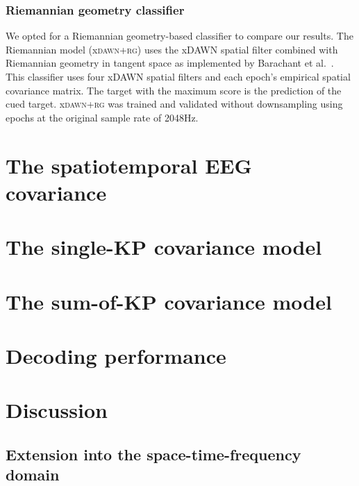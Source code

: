 \subsubsection{Riemannian geometry classifier}
\label{sec:riemannian}
We opted for a Riemannian
geometry-based classifier to compare our results.
The Riemannian model (x\textsc{dawn+rg}) uses the xDAWN spatial filter combined
with Riemannian geometry in tangent space as implemented by Barachant et
al.~\cite{barachant2014meg}.
This classifier uses four xDAWN spatial filters and each epoch's empirical spatial covariance matrix.
The target with the maximum score is the prediction of the cued target.
x\textsc{dawn+rg} was trained and validated without downsampling using epochs
at the original sample rate of 2048Hz.

\section{The spatiotemporal EEG covariance}
\section{The single-KP covariance model}
\section{The sum-of-KP covariance model}
\section{Decoding performance}
\section{Discussion}
\subsection{Extension into the space-time-frequency domain}
